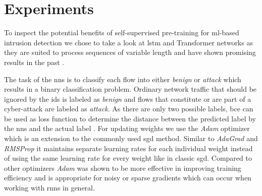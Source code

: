 \chapter{Experiments}\label{sec:experiments}

To inspect the potential benefits of self-supervised pre-training for \gls{ml}-based intrusion detection we chose to take a look at \gls{lstm} and Transformer networks as they are suited to process sequences of variable length and have shown promising results in the past . 

The task of the \glspl{nn} is to classify each flow into either \textit{benign} or \textit{attack} which results in a binary classification problem. Ordinary network traffic that should be ignored by the \gls{ids} is labeled as \textit{benign} and flows that constitute or are part of a cyber-attack are labeled as \textit{attack}. As there are only two possible labels, \gls{bce} can be used as loss function to determine the distance between the predicted label by the \glspl{nn} and the actual label . For updating weights we use the \textit{Adam} optimizer \cite{adam} which is an extension to the commonly used \gls{sgd} method. Similar to \textit{AdaGrad} \cite{optimizer_comparison} and \textit{RMSProp} \cite{optimizer_comparison} it maintains separate learning rates for each individual weight instead of using the same learning rate for every weight like in classic \gls{sgd}. Compared to other optimizers \textit{Adam} was shown to be more effective in improving training efficiency \cite{adam} and is appropriate for noisy or sparse gradients which can occur when working with \glspl{rnn} in general.

